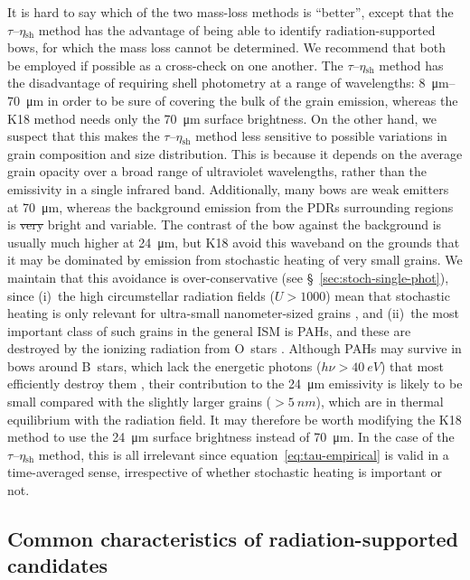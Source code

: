 \documentclass[useAMS, usenatbib, a4paper]{mnras}
\newcommand\shell{\ensuremath{_{\text{sh}}}}
\newcommand\hii{\ion{H}{ii}}
\providecommand{\DIFaddtex}[1]{{\protect\color{red!70!black}\uwave{#1}}} %
\providecommand{\DIFdeltex}[1]{{\protect\color{white!50!black} \ifmmode\cancel{#1}\else\sout{#1}\fi}} %
\providecommand{\DIFaddbegin}{} %
\providecommand{\DIFaddend}{} %
\providecommand{\DIFdelbegin}{} %
\providecommand{\DIFdelend}{} %
\providecommand{\DIFadd}[1]{\texorpdfstring{\DIFaddtex{#1}}{#1}} %
\providecommand{\DIFdel}[1]{\texorpdfstring{\DIFdeltex{#1}}{}} %
\begin{document}
It is hard to say which of the two mass-loss methods is ``better'',
except that the \(\tau\)--\(\eta\shell\) method has the advantage of
being able to identify radiation-supported bows, for which the mass
loss cannot be determined.  We recommend that both be employed if
possible as a cross-check on one another.  The
\(\tau\)--\(\eta\shell\) method has the disadvantage of requiring
shell photometry at a range of wavelengths: \SIrange{8}{70}{\um} in
order to be sure of covering the bulk of the grain emission, whereas
the K18 method needs only the \SI{70}{\um} surface brightness.  On the
other hand, we suspect that this makes the \(\tau\)--\(\eta\shell\)
method less sensitive to possible variations in grain composition and
size distribution.  This is because it depends on the average grain
opacity over a broad range of ultraviolet wavelengths, rather than the
emissivity in a single infrared band.  Additionally, many bows are
weak emitters at \SI{70}{\um}, whereas the background emission from
the PDRs surrounding \hii{} regions is \DIFdelbegin \DIFdel{very }\DIFdelend \DIFaddbegin \DIFadd{ion papervery }\DIFaddend bright and variable.  The
contrast of the bow against the background is usually much higher at
\SI{24}{\um}, but K18 avoid this waveband on the grounds that it may
be dominated by emission from stochastic heating of very small grains.
We maintain that this avoidance is over-conservative (see
\S~\ref{sec:stoch-single-phot}), since (i)~the high circumstellar
radiation fields (\(U > 1000\)) mean that stochastic heating is only
relevant for ultra-small nanometer-sized grains \citep{Draine:2001a},
and (ii)~the most important class of such grains in the general ISM is
PAHs, and these are destroyed by the ionizing radiation from O~stars
\citep{Desert:1990a}.  Although PAHs may survive in bows around
B~stars, which lack the energetic photons (\(h\nu > \SI{40}{eV}\))
that most efficiently destroy them \citep{Lebouteiller:2007a}, their
contribution to the \SI{24}{\um} emissivity is likely to be small
compared with the slightly larger grains (\(> \SI{5}{nm}\)), which are
in thermal equilibrium with the radiation field.  It may therefore be
worth modifying the K18 method to use the \SI{24}{\um} surface
brightness instead of \SI{70}{\um}.  In the case of the
\(\tau\)--\(\eta\shell\) method, this is all irrelevant since
equation~\eqref{eq:tau-empirical} is valid in a time-averaged sense,
irrespective of whether stochastic heating is important or not.


\subsection{Common characteristics of radiation-supported candidates}
\label{sec:comm-prop-cand}
\end{document}
